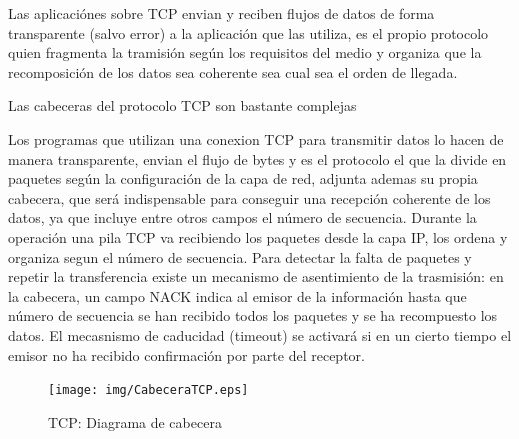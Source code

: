 \documentclass[a4paper,spanish,12pt]{book}
\begin{document}
Las aplicaciónes sobre TCP envian y reciben flujos de datos de forma transparente (salvo error) a la aplicación que las utiliza, es el propio protocolo quien fragmenta la tramisión según los requisitos del medio y organiza que la recomposición de los datos sea coherente sea cual sea el orden de llegada.

Las cabeceras del protocolo TCP son bastante complejas

Los programas que utilizan una conexion TCP para transmitir datos lo hacen de manera transparente, envian el flujo de bytes y es el protocolo el que la divide en paquetes según la configuración de la capa de red, adjunta ademas su propia cabecera, que será indispensable para conseguir una recepción coherente de los datos, ya que incluye entre otros campos el número de secuencia. Durante la operación una pila TCP va recibiendo los paquetes desde la capa IP, los ordena y organiza segun el número de secuencia. Para detectar la falta de paquetes y repetir la transferencia existe un mecanismo de asentimiento de la trasmisión: en la cabecera, un campo NACK indica al emisor de la información hasta que número de secuencia se han recibido todos los paquetes y se ha recompuesto los datos. El mecasnismo de caducidad (timeout) se activará si en un cierto tiempo el emisor no ha recibido confirmación por parte del receptor.
\begin{figure}[h]
	\begin{center}
	\texttt{[image: img/CabeceraTCP.eps]}	
\end{center}
\caption{TCP: Diagrama de cabecera}
  \label{fig:CabeceraTCP}
\end{figure}
\end{document}

